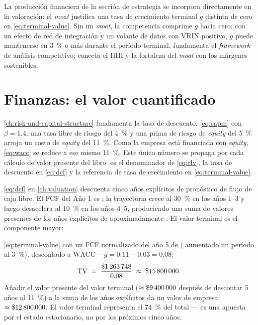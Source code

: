 La producción financiera de la sección de estrategia se incorpora directamente en la valoración:
el \emph{moat} justifica una tasa de crecimiento terminal $g$ distinta de cero en
\cref{eq:terminal-value}. Sin un \emph{moat}, la competencia comprime $g$ hacia cero; con un
efecto de red de integración y un volante de datos con VRIN positivo, $g$ puede mantenerse en
\qty{3}{\percent} o más durante el período terminal. \textcite{porter1985} fundamenta el
\emph{framework} de análisis competitivo; \textcite{dranove7theconomics} conecta el HHI y la
fortaleza del \emph{moat} con los márgenes sostenibles.

\section{Finanzas: el valor cuantificado}\label{sec:capstone-finance}

\cref{ch:risk-and-capital-structure} fundamenta la tasa de descuento. \cref{eq:capm} con
\(\beta=1.4\), una tasa libre de riesgo del \qty{4}{\percent} y una prima de riesgo de
\emph{equity} del \qty{5}{\percent} arroja un costo de \emph{equity} del \qty{11}{\percent}.
Como la empresa está financiada con \emph{equity}, \cref{eq:wacc} se reduce a ese mismo
\qty{11}{\percent}. Este único número se propaga por cada cálculo de valor presente del libro:
es el denominador de \cref{eq:clv}, la tasa de descuento en \cref{eq:dcf} y la referencia de
tasa de crecimiento en \cref{eq:terminal-value}.

\cref{eq:dcf} en \cref{ch:valuation} descuenta cinco años explícitos de pronóstico de flujo de
caja libre. El FCF del Año 1 es ; la trayectoria crece al \qty{30}{\percent} en
los años 1--3 y luego desacelera al \qty{10}{\percent} en los años 4--5, produciendo una suma de
valores presentes de los años explícitos de aproximadamente . El valor terminal
es el componente mayor:

\begin{example}
\cref{eq:terminal-value} con un FCF normalizado del año 5 de  (
aumentado un período al \qty{3}{\percent}), descontado a \(\mathrm{WACC}-g = 0.11-0.03 = 0.08\):
\[
  \mathrm{TV} \;=\; \frac{\$\num{1263748}}{0.08} \;\approx\; \$\num{15800000}.
\]
Añadir el valor presente del valor terminal (\(\approx\$\num{9400000}\) después de descontar
5 años al \qty{11}{\percent}) a la suma de los años explícitos da un valor de empresa
\(\approx\$\num{12800000}\). El valor terminal representa el \qty{74}{\percent} del total ---
es una apuesta por el estado estacionario, no por los próximos cinco años.
\end{example}


